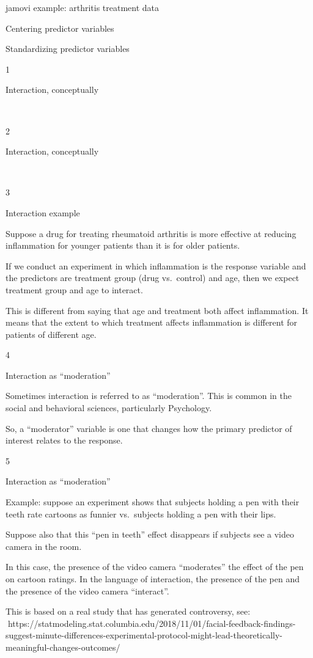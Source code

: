 \documentclass[
  letterpaper,
  DIV=11,
  numbers=noendperiod]{scrreprt}
\begin{document}
jamovi example: arthritis treatment data

Centering predictor variables

Standardizing predictor variables

1

Interaction, conceptually

~

2

Interaction, conceptually

~

3

Interaction example

Suppose a drug for treating rheumatoid arthritis is more effective at
reducing inflammation for younger patients than it is for older
patients.

If we conduct an experiment in which inflammation is the response
variable and the predictors are treatment group (drug vs.~control) and
age, then we expect treatment group and age to interact.

This is different from saying that age and treatment both affect
inflammation. It means that the extent to which treatment affects
inflammation is different for patients of different age.

4

Interaction as ``moderation''

Sometimes interaction is referred to as ``moderation''. This is common
in the social and behavioral sciences, particularly Psychology.

So, a ``moderator'' variable is one that changes how the primary
predictor of interest relates to the response.

5

Interaction as ``moderation''

Example: suppose an experiment shows that subjects holding a pen with
their teeth rate cartoons as funnier vs.~subjects holding a pen with
their lips.

Suppose also that this ``pen in teeth'' effect disappears if subjects
see a video camera in the room.

In this case, the presence of the video camera ``moderates'' the effect
of the pen on cartoon ratings. In the language of interaction, the
presence of the pen and the presence of the video camera ``interact''.

This is based on a real study that has generated controversy, see:
https://statmodeling.stat.columbia.edu/2018/11/01/facial-feedback-findings-suggest-minute-differences-experimental-protocol-might-lead-theoretically-meaningful-changes-outcomes/
\end{document}
